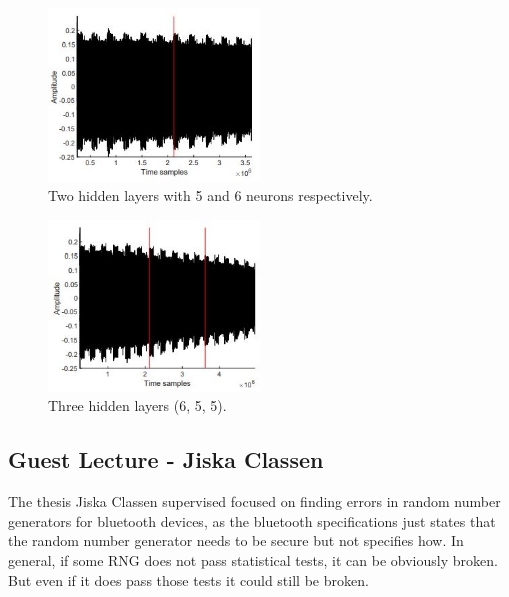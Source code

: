 \begin{figure}
    \centering
    \includegraphics[width=0.5\textwidth]{images/chapter8/layer-b.JPG}
    \caption{Two hidden layers with 5 and 6 neurons respectively.}
    \label{fig:layer-b}
\end{figure}

\begin{figure}
    \centering
    \includegraphics[width=0.5\textwidth]{images/chapter8/layer-c.JPG}
    \caption{Three hidden layers (6, 5, 5).}
    \label{fig:layer-c}
\end{figure}

\subsection{Guest Lecture - Jiska Classen}
The thesis Jiska Classen supervised focused on finding errors in random number generators for bluetooth devices, as the bluetooth specifications just states that the random number generator needs to be secure but not specifies how.
In general, if some RNG does not pass statistical tests, it can be obviously broken.
But even if it does pass those tests it could still be broken.\\


